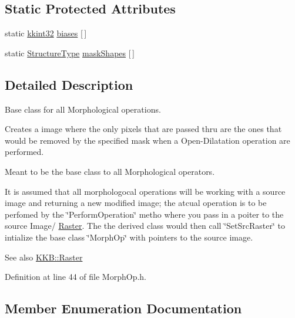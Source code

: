 \subsection*{Static Protected Attributes}
\begin{DoxyCompactItemize}
\item 
static \hyperlink{namespace_k_k_b_a8fa4952cc84fda1de4bec1fbdd8d5b1b}{kkint32} \hyperlink{class_k_k_b_1_1_morph_op_a56600e618b25e7c2cda6f513645158e3}{biases} \mbox{[}$\,$\mbox{]}
\item 
static \hyperlink{class_k_k_b_1_1_morph_op_a09e4aff7e81327849855ff72082d85b3}{Structure\+Type} \hyperlink{class_k_k_b_1_1_morph_op_a7e8ac61b2b389a4b644566daee2972d4}{mask\+Shapes} \mbox{[}$\,$\mbox{]}
\end{DoxyCompactItemize}


\subsection{Detailed Description}
Base class for all Morphological operations. 

Creates a image where the only pixels that are passed thru are the ones that would be removed by the specified mask when a Open-\/\+Dilatation operation are performed.

Meant to be the base class to all Morphological operators.

It is assumed that all morphologocal operations will be working with a source image and returning a new modified image; the atcual operation is to be perfomed by the \char`\"{}\+Perform\+Operation\char`\"{} metho where you pass in a poiter to the source Image/ \hyperlink{class_k_k_b_1_1_raster}{Raster}. The the derived class would then call \char`\"{}\+Set\+Src\+Raster\char`\"{} to intialize the base class \char`\"{}\+Morph\+Op\char`\"{} with pointers to the source image.

\begin{DoxySeeAlso}{See also}
\hyperlink{class_k_k_b_1_1_raster}{K\+K\+B\+::\+Raster} 
\end{DoxySeeAlso}


Definition at line 44 of file Morph\+Op.\+h.



\subsection{Member Enumeration Documentation}

